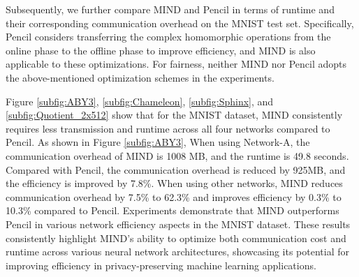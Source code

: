 \documentclass[conference]{IEEEtran}
\begin{document}




Subsequently, we further compare MIND and Pencil \cite{liu2024pencilprivateextensiblecollaborative}  in terms of runtime and their corresponding communication overhead on the MNIST test set.
Specifically, Pencil considers transferring the complex homomorphic operations from the online phase to the offline phase to improve efficiency, and MIND is also applicable to these optimizations.
For fairness, neither MIND nor Pencil adopts the above-mentioned optimization schemes in the experiments.






 



Figure \ref{subfig:ABY3}, \ref{subfig:Chameleon}, \ref{subfig:Sphinx}, and \ref{subfig:Quotient_2x512} show that for the MNIST dataset, MIND consistently requires less transmission and runtime across all four networks compared to Pencil.
As shown in Figure \ref{subfig:ABY3}, When using Network-A, the communication overhead of MIND is 1008 MB, and the runtime is 49.8 seconds. Compared with Pencil, the communication overhead is reduced by 925MB, and the efficiency is improved by 7.8\%. When using other networks, MIND reduces communication overhead by 7.5\% to 62.3\% and improves efficiency by 0.3\% to 10.3\% compared to Pencil. Experiments demonstrate that MIND outperforms Pencil in various network efficiency aspects in the MNIST dataset. These results consistently highlight MIND's ability to optimize both communication cost and runtime across various neural network architectures, showcasing its potential for improving efficiency in privacy-preserving machine learning applications.
\end{document}
